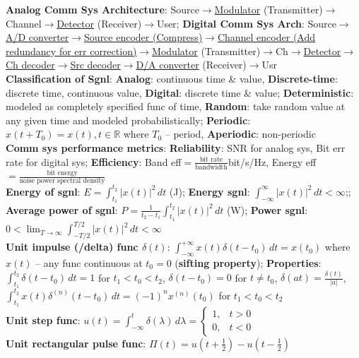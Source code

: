 \documentclass[UTF8,a4paper,10pt]{article}
\providecommand{\abs}[1]{\left\lvert#1\right\rvert}
\begin{document}
\scriptsize
\begin{multicols}{2}
    \noindent\textbf{Analog Comm Sys Architecture}: Source$\rightarrow$\uline{Modulator} (Transmitter)$\rightarrow$Channel$\rightarrow$\uline{Detector} (Receiver)$\rightarrow$User; \textbf{Digital Comm Sys Arch}: Source$\rightarrow$\uline{A/D converter$\rightarrow$Source encoder (Compress)$\rightarrow$Channel encoder (Add redundancy for err correction)$\rightarrow$Modulator} (Transmitter)$\rightarrow$Ch$\rightarrow$\uline{Detector$\rightarrow$Ch decoder$\rightarrow$Src decoder$\rightarrow$D/A converter} (Receiver)$\rightarrow$Usr\\
    \textbf{Classification of Sgnl}: \textbf{Analog}: continuous time \& value, \textbf{Discrete-time}: discrete time, continuous value, \textbf{Digital}: discrete time \& value; \textbf{Deterministic}: modeled as completely specified func of time, \textbf{Random}: take random value at any given time and modeled probabilistically; \textbf{Periodic}: $x(t+T_0)=x(t),t\in\mathbb{R}$ where $T_0$ -- period, \textbf{Aperiodic}: non-periodic\\
    \textbf{Comm sys performance metrics}: \textbf{Reliability}: SNR for analog sys, Bit err rate for digital sys; \textbf{Efficiency}: Band eff$=\frac{\text{bit rate}}{\text{bandwidth}}$bit/s/Hz, Energy eff$=\frac{\text{bit energy}}{\text{noise power spectral density}}$\\
    \textbf{Energy of sgnl}: $E=\int_{t_1}^{t_2}\abs{x(t)}^2\,dt$ (J); \textbf{Energy sgnl}: $\int_{-\infty}^{\infty}\abs{x(t)}^2\,dt<\infty$;; \textbf{Average power of sgnl}: $P=\frac{1}{t_2-t_1}\int_{t_1}^{t_2}\abs{x(t)}^2\,dt$ (W); \textbf{Power sgnl}: $0<\lim_{T\rightarrow\infty}\int_{-T/2}^{T/2}\abs{x(t)}^2\,dt<\infty$\\
    \textbf{Unit impulse (/delta) func $\delta(t)$}: $\int_{-\infty}^{+\infty}x(t)\delta(t-t_0)\,dt=x(t_0)$ where $x(t)$ -- any func continuous at $t_0=0$ (\textbf{sifting property}); \textbf{Properties}: $\int_{t_1}^{t_2}\delta(t-t_0)\,dt=1$ for $t_1<t_0<t_2$, $\delta(t-t_0)=0$ for $t\neq t_0$, $\delta(at)=\frac{\delta(t)}{\abs{a}}$, $\int_{t_1}^{t_2}x(t)\delta^{(n)}(t-t_0)\,dt=(-1)^nx^{(n)}(t_0)$ for $t_1<t_0<t_2$\\
    \textbf{Unit step func}: $u(t)=\int_{-\infty}^t\delta(\lambda)\,d\lambda=\left\{\begin{array}{ll}
        1,&t>0\\
        0,&t<0
    \end{array}\right.$\\
    \textbf{Unit rectangular pulse func}: $\Pi(t)=u(t+\frac{1}{2})-u(t-\frac{1}{2})$\\

\end{multicols}
\end{document}

